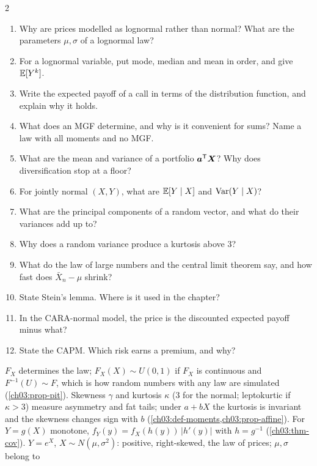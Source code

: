\begin{paracol}{2}
\begin{keyconcepts}
\keyquestions
\begin{enumerate}[1.]
  \item Why are prices modelled as lognormal rather than normal? What are the parameters $\mu,\sigma$ of a lognormal law?
  \item For a lognormal variable, put mode, median and mean in order, and give $\mathbb{E}[Y^k]$.
  \item Write the expected payoff of a call in terms of the distribution function, and explain why it holds.
  \item What does an MGF determine, and why is it convenient for sums? Name a law with all moments and no MGF.
  \item What are the mean and variance of a portfolio $\bm a^{\mathsf T}\bm X$? Why does diversification stop at a floor?
  \item For jointly normal $(X,Y)$, what are $\mathbb{E}[Y\mid X]$ and $\operatorname{Var}(Y\mid X)$?
  \item What are the principal components of a random vector, and what do their variances add up to?
  \item Why does a random variance produce a kurtosis above 3?
  \item What do the law of large numbers and the central limit theorem say, and how fast does $\bar X_n-\mu$ shrink?
  \item State Stein's lemma. Where is it used in the chapter?
  \item In the CARA-normal model, the price is the discounted expected payoff minus what?
  \item State the CAPM. Which risk earns a premium, and why?
\end{enumerate}
\keylist
\begin{description}[leftmargin=0pt,itemsep=3pt]
   $F_X$ determines the law; $F_X(X)\sim U(0,1)$ if $F_X$ is continuous and
    $F^{-1}(U)\sim F$, which is how random numbers with any law are simulated (\cref{ch03:prop-pit}).
   Skewness $\gamma$ and kurtosis $\kappa$ (3 for the normal; leptokurtic if $\kappa>3$) measure
    asymmetry and fat tails; under $a+bX$ the kurtosis is invariant and the skewness changes sign with $b$
    (\cref{ch03:def-moments,ch03:prop-affine}).
   For $Y=g(X)$ monotone, $f_Y(y)=f_X(h(y))\,|h'(y)|$ with $h=g^{-1}$ (\cref{ch03:thm-cov}).
   $Y=e^X$, $X\sim N(\mu,\sigma^2)$: positive, right-skewed, the law of prices; $\mu,\sigma$ belong to

\end{description}
\end{keyconcepts}
\end{paracol}
